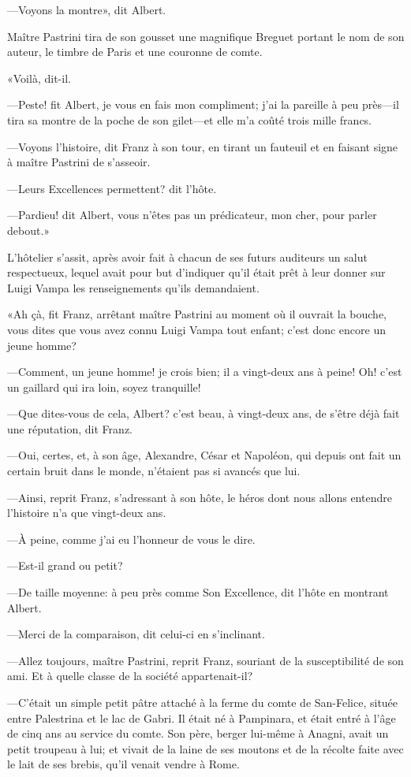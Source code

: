 —Voyons la montre», dit Albert. 

Maître Pastrini tira de son gousset une magnifique Breguet portant le nom de son auteur, le timbre de Paris et une couronne de comte. 

«Voilà, dit-il. 

—Peste! fit Albert, je vous en fais mon compliment; j'ai la pareille à peu près—il tira sa montre de la poche de son gilet—et elle m'a coûté trois mille francs. 

—Voyons l'histoire, dit Franz à son tour, en tirant un fauteuil et en faisant signe à maître Pastrini de s'asseoir. 

—Leurs Excellences permettent? dit l'hôte. 

—Pardieu! dit Albert, vous n'êtes pas un prédicateur, mon cher, pour parler debout.» 

L'hôtelier s'assit, après avoir fait à chacun de ses futurs auditeurs un salut respectueux, lequel avait pour but d'indiquer qu'il était prêt à leur donner sur Luigi Vampa les renseignements qu'ils demandaient. 

«Ah çà, fit Franz, arrêtant maître Pastrini au moment où il ouvrait la bouche, vous dites que vous avez connu Luigi Vampa tout enfant; c'est donc encore un jeune homme? 

—Comment, un jeune homme! je crois bien; il a vingt-deux ans à peine! Oh! c'est un gaillard qui ira loin, soyez tranquille! 

—Que dites-vous de cela, Albert? c'est beau, à vingt-deux ans, de s'être déjà fait une réputation, dit Franz. 

—Oui, certes, et, à son âge, Alexandre, César et Napoléon, qui depuis ont fait un certain bruit dans le monde, n'étaient pas si avancés que lui. 

—Ainsi, reprit Franz, s'adressant à son hôte, le héros dont nous allons entendre l'histoire n'a que vingt-deux ans.  

—À peine, comme j'ai eu l'honneur de vous le dire. 

—Est-il grand ou petit? 

—De taille moyenne: à peu près comme Son Excellence, dit l'hôte en montrant Albert. 

—Merci de la comparaison, dit celui-ci en s'inclinant. 

—Allez toujours, maître Pastrini, reprit Franz, souriant de la susceptibilité de son ami. Et à quelle classe de la société appartenait-il? 

—C'était un simple petit pâtre attaché à la ferme du comte de San-Felice, située entre Palestrina et le lac de Gabri. Il était né à Pampinara, et était entré à l'âge de cinq ans au service du comte. Son père, berger lui-même à Anagni, avait un petit troupeau à lui; et vivait de la laine de ses moutons et de la récolte faite avec le lait de ses brebis, qu'il venait vendre à Rome. 

